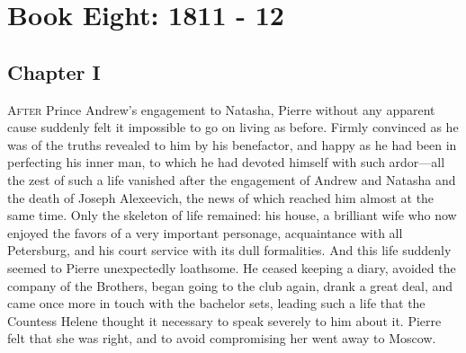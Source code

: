 \part*{Book Eight: 1811 - 12}


\chapter*{Chapter I}
\ifaudio
{} 
\fi

\lettrine[lines=2, loversize=0.3, lraise=0]{\initfamily A}{fter}
Prince Andrew's engagement to Natasha, Pierre without any
apparent cause suddenly felt it impossible to go on living as
before. Firmly convinced as he was of the truths revealed to him
by his benefactor, and happy as he had been in perfecting his
inner man, to which he had devoted himself with such ardor---all
the zest of such a life vanished after the engagement of Andrew
and Natasha and the death of Joseph Alexeevich, the news of which
reached him almost at the same time. Only the skeleton of life
remained: his house, a brilliant wife who now enjoyed the favors
of a very important personage, acquaintance with all Petersburg,
and his court service with its dull formalities. And this life
suddenly seemed to Pierre unexpectedly loathsome. He ceased
keeping a diary, avoided the company of the Brothers, began going
to the club again, drank a great deal, and came once more in
touch with the bachelor sets, leading such a life that the
Countess Helene thought it necessary to speak severely to him
about it. Pierre felt that she was right, and to avoid
compromising her went away to Moscow.

